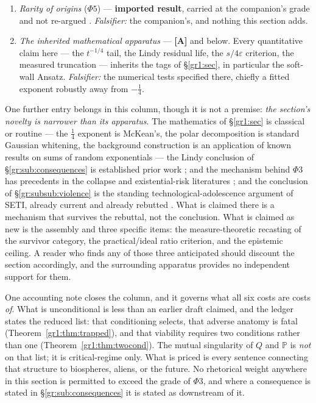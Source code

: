 \documentclass[11pt]{article}
\numberwithin{equation}{section}
\theoremstyle{plain}
\theoremstyle{definition}
\theoremstyle{remark}
\newcommand{\PP}{\mathbb{P}}
\begin{document}
\begin{enumerate}[itemsep=2pt]
\item \emph{Rarity of origins} ($\Phi5$) --- \textbf{imported result},
carried at the companion's grade and not re-argued
\cite{Ben24Nexus, Ben26Found, Ben26Optimal}. \emph{Falsifier:} the
companion's, and nothing this section adds.

\item \emph{The inherited mathematical apparatus} --- \textbf{[A]} and
below. Every quantitative claim here --- the $t^{-1/4}$ tail, the Lindy
residual life, the $s/4\varepsilon$ criterion, the measured truncation
--- inherits the tags of \S\ref{gr1:sec}, in
particular the soft-wall Ansatz. \emph{Falsifier:} the numerical tests
specified there, chiefly a fitted exponent robustly away from
$-\tfrac14$.
\end{enumerate}

\noindent One further entry belongs in this column, though it is not a
premise: \emph{the section's novelty is narrower than its apparatus}.
The mathematics of \S\ref{gr1:sec} is classical or routine --- the
$\tfrac14$ exponent is McKean's, the polar decomposition is standard
Gaussian whitening, the background construction is an application of
known results on sums of random exponentials --- the Lindy
conclusion of \S\ref{gr:sub:consequences} is established prior work
\cite{BC21,BG24,Kip20,Ord23}; and the mechanism behind $\Phi3$ has
precedents in the collapse and existential-risk literatures
\cite{Tainter88,Bostrom19,EF24}; and the conclusion of
\S\ref{gr:subsub:violence} is the standing technological-adolescence
argument of SETI, already current and already rebutted
\cite{Cooper19}. What is claimed there is a mechanism that survives the
rebuttal, not the conclusion. What is claimed as new is the assembly
and three specific items: the measure-theoretic recasting of the
survivor category, the practical/ideal ratio criterion, and the
epistemic ceiling. A reader who finds any of those three anticipated
should discount the section accordingly, and the surrounding apparatus
provides no independent support for them.

One accounting note closes the column, and it governs what all
six costs are costs \emph{of}. What is unconditional is less than an earlier draft claimed, and the
ledger states the reduced list: that conditioning selects, that adverse
anatomy is fatal (Theorem~\ref{gr1:thm:trapped}), and that viability
requires two conditions rather than one
(Theorem~\ref{gr1:thm:twocond}). The mutual singularity of $Q$ and
$\PP$ is \emph{not} on that list; it is critical-regime only. What is priced is every sentence connecting that structure to
biospheres, aliens, or the future. No rhetorical weight anywhere in this
section is permitted to exceed the grade of $\Phi3$, and where a
consequence is stated in \S\ref{gr:sub:consequences} it is stated as
downstream of it.
\end{document}
